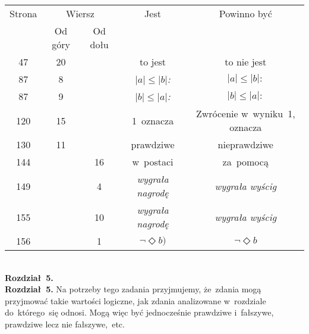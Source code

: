 \documentclass[a4paper,11pt]{article}
\numberwithin{equation}{section}
\begin{document}
\begin{center}

  \begin{tabular}{|c|c|c|c|c|}
    \hline
    Strona & \multicolumn{2}{c|}{Wiersz} & Jest
    & Powinno być \\ \cline{2-3}
    & Od góry & Od dołu & & \\
    \hline
    \hphantom{0}47 & 20 & & to jest & to nie jest \\
    \hphantom{0}87 & \hphantom{0}8 &
    & $| a | \!\! \leq | b |$\textit{:} & $| a | \leq | b |:$ \\
    \hphantom{0}87 & \hphantom{0}9 &
    & $| b | \!\! \leq | a |$\textit{:} & $| b | \leq | a |:$ \\
    120 & 15 & & 1~oznacza & Zwrócenie w~wyniku~1, oznacza \\
    130 & 11 & & prawdziwe & nieprawdziwe \\
    144 & & 16 & w~postaci & za~pomocą \\
    149 & & \hphantom{0}4 & \textit{wygrała nagrodę}
    & \textit{wygrała wyścig} \\
    155 & & 10 & \textit{wygrała nagrodę} & \textit{wygrała wyścig} \\
    156 & & \hphantom{0}1 & $\neg \Diamond b)$ & $\neg \Diamond b$ \\
    \hline
  \end{tabular}







\end{center}

\VerSpaceTwo


\noindent
{} \\
\Jest \textbf{Rozdział~5.} \\
\PowinnoByc \textbf{Rozdział~5.} Na potrzeby tego zadania przyjmujemy,
że~zdania mogą przyjmować takie wartości logiczne, jak zdania analizowane
w~rozdziale do~którego~się odnosi. Mogą więc być jednocześnie prawdziwe
i~fałszywe, prawdziwe lecz nie fałszywe,~etc.
\end{document}

